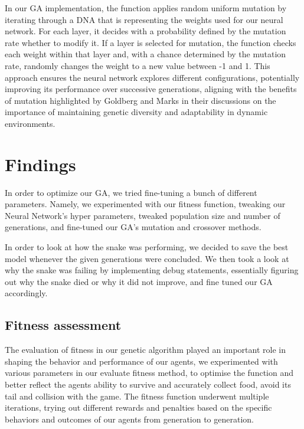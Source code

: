 \documentclass[a4paper, twocolumn]{article}
\begin{document}
In our GA implementation, the function applies random uniform mutation by iterating through a DNA that is representing the weights used for our neural network. For each layer, it decides with a probability defined by the mutation rate whether to modify it. If a layer is selected for mutation, the function checks each weight within that layer and, with a chance determined by the mutation rate, randomly changes the weight to a new value between -1 and 1. This approach ensures the neural network explores different configurations, potentially improving its performance over successive generations, aligning with the benefits of mutation highlighted by Goldberg \cite{goldberg1989genetic} and Marks \cite{marks2001playing} in their discussions on the importance of maintaining genetic diversity and adaptability in dynamic environments.


\section{Findings\label{sec:Findings}}

In order to optimize our GA, we tried fine-tuning a bunch of different parameters. Namely, we experimented with our fitness function, tweaking our Neural Network's hyper parameters, tweaked population size and number of generations, and fine-tuned our GA's mutation and crossover methods. 

In order to look at how the snake was performing, we decided to save the best model whenever the given generations were concluded. We then took a look at why the snake was failing by implementing debug statements, essentially figuring out why the snake died or why it did not improve, and fine tuned our GA accordingly. 

\subsection{Fitness assessment\label{sec:Fitness assessment}}

The evaluation of fitness in our genetic algorithm played an important role in shaping the behavior and performance of our agents, we experimented with various parameters in our evaluate fitness method, to optimise the function and better reflect the agents ability to survive and accurately collect food, avoid its tail and collision with the game. The fitness function underwent multiple iterations, trying out different rewards and penalties based on the specific behaviors and outcomes of our agents from generation to generation. 
\end{document}
